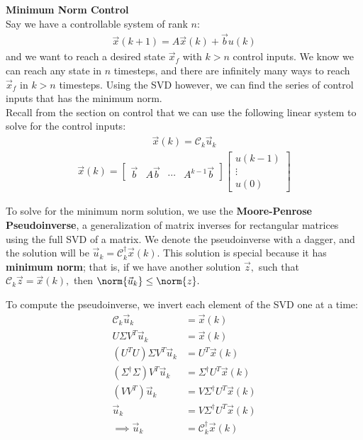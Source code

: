 \newpage
\textbf{Minimum Norm Control} \\
Say we have a controllable system of rank $n$:
\begin{align*}
    \vec{x}(k + 1) = A\vec{x}(k) + \vec{b}u(k)
\end{align*}
 and we want to reach a desired state $\vec{x}_f$ with $k > n$ control inputs. We know we can reach any state in $n$ timesteps, and there are infinitely many ways to reach $\vec{x}_f$ in $k > n$ timesteps. Using the SVD however, we can find the series of control inputs that has the minimum norm. \\
 \newline
 Recall from the section on control that we can use the following linear system to solve for the control inputs:
 \begin{align*}
    \vec{x}(k) = \mathcal{C}_k \vec{u}_k
\end{align*}
\begin{align*}
    \vec{x}(k) = \begin{bmatrix}
        \vec{b} & A\vec{b} & \cdots & A^{k - 1} \vec{b}
    \end{bmatrix} \begin{bmatrix}
        u(k - 1) \\ \vdots \\ u(0)
    \end{bmatrix}
 \end{align*}

To solve for the minimum norm solution, we use the \textbf{Moore-Penrose Pseudoinverse}, a generalization of matrix inverses for rectangular matrices using the full SVD of a matrix. We denote the pseudoinverse with a dagger, and the solution will be $\vec{u}_k = \mathcal{C}_k^{\dagger} \vec{x}(k).$ 
This solution is special because it has \textbf{minimum norm}; that is, if we have another solution $\vec{z},$ such that $\mathcal{C}_k \vec{z} = \vec{x}(k),$ then $\norm{\vec{u}_k} \leq \norm{z}.$

To compute the pseudoinverse, we invert each element of the SVD one at a time:
\begin{align*}
    \mathcal{C}_k \vec{u}_k &= \vec{x}(k) \\
    U \Sigma V^T \vec{u}_k &= \vec{x}(k)\\
    (U^T U) \Sigma V^T \vec{u}_k &= U^T \vec{x}(k) \\
    (\Sigma^{\dagger} \Sigma) V^T \vec{u}_k &= \Sigma^{\dagger} U^T \vec{x}(k) \\
    (V V^T) \vec{u}_k &= V \Sigma^{\dagger} U^T \vec{x}(k) \\
    \vec{u}_k &= V \Sigma^{\dagger} U^T \vec{x}(k) \\
    \implies \vec{u}_k &= \mathcal{C}_k^{\dagger} \vec{x}(k)
\end{align*}

